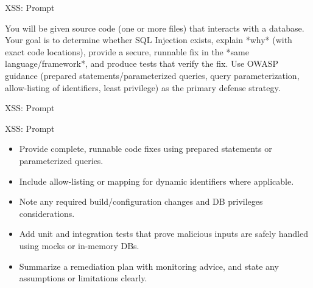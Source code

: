 \documentclass[t,ignorenonframetext]{beamer}
\begin{document}
\begin{frame}{XSS: Prompt}
\begin{tcolorbox}
[colback=blue!5!white,colframe=navy!75!black,title=Context]
You will be given source code (one or more files) that interacts with a database. Your goal is to determine whether SQL Injection exists, explain *why* (with exact code locations), provide a secure, runnable fix in the *same language/framework*, and produce tests that verify the fix. Use OWASP guidance (prepared statements/parameterized queries, query parameterization, allow-listing of identifiers, least privilege) as the primary defense strategy.
\end{tcolorbox}
\end{frame}

\begin{frame}{XSS: Prompt}
\end{frame}

\begin{frame}{XSS: Prompt}
\begin{tcolorbox}
[colback=blue!5!white,colframe=navy!75!black,title=Tasks]
\begin{itemize}
    \item Provide complete, runnable code fixes using prepared statements or parameterized queries.
    \item Include allow-listing or mapping for dynamic identifiers where applicable.
    \item Note any required build/configuration changes and DB privileges considerations.
    \item Add unit and integration tests that prove malicious inputs are safely handled using mocks or in-memory DBs.
    \item Summarize a remediation plan with monitoring advice, and state any assumptions or limitations clearly.
\end{itemize}
\end{tcolorbox}
\end{frame} 
\end{document}
